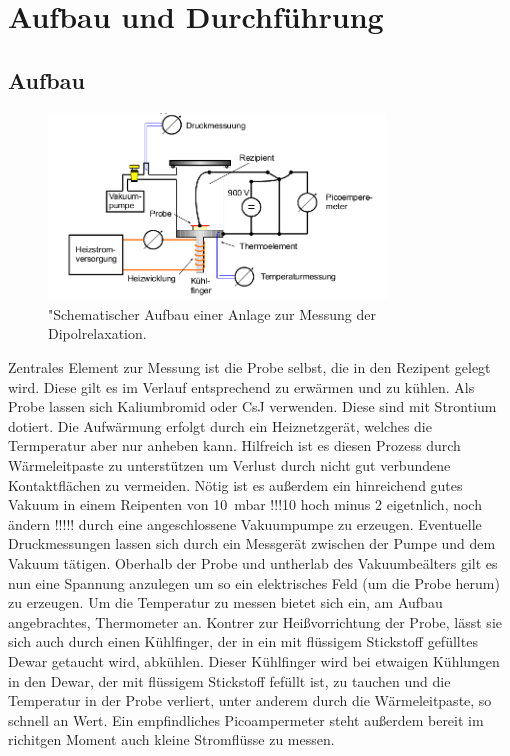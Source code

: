 \section{Aufbau und Durchführung}
\subsection{Aufbau}
\begin{figure}
    \centering
    \includegraphics[width=0.8\textwidth]{bilder/Aufbau.png}
    \caption{"Schematischer Aufbau einer Anlage zur Messung der Dipolrelaxation.
            \cite{skript}}
    \label{fig:aufbau}
\end{figure}

Zentrales Element zur Messung ist die Probe selbst, die in den Rezipent gelegt wird. Diese gilt es im Verlauf entsprechend
zu erwärmen und zu kühlen. Als Probe lassen sich Kaliumbromid oder CsJ verwenden. Diese sind mit Strontium
dotiert. Die Aufwärmung erfolgt durch ein Heiznetzgerät, welches die Termperatur aber nur anheben kann.
Hilfreich ist es diesen Prozess durch Wärmeleitpaste zu unterstützen um
Verlust durch nicht gut verbundene Kontaktflächen zu vermeiden.
Nötig ist es außerdem ein hinreichend gutes Vakuum in einem Reipenten von \SI{10}{\milli\bar} !!!10 hoch minus 2 eigetnlich, noch ändern !!!!! 
durch eine angeschlossene Vakuumpumpe zu erzeugen.
Eventuelle Druckmessungen  lassen sich durch ein Messgerät zwischen der Pumpe und dem Vakuum tätigen.
Oberhalb der Probe und untherlab des Vakuumbeälters gilt es nun eine Spannung anzulegen um so ein 
elektrisches Feld (um die Probe herum) zu erzeugen. Um die Temperatur zu messen bietet sich ein, am Aufbau angebrachtes, Thermometer an.
Kontrer zur Heißvorrichtung der Probe, lässt sie sich auch durch einen Kühlfinger, der in ein mit flüssigem Stickstoff gefülltes Dewar getaucht wird, 
abkühlen.
Dieser Kühlfinger wird bei etwaigen Kühlungen in den Dewar, 
der mit flüssigem Stickstoff fefüllt ist, 
zu tauchen und die Temperatur in der Probe verliert, unter anderem durch die Wärmeleitpaste, so schnell an Wert.
Ein empfindliches Picoampermeter steht außerdem bereit im richitgen Moment auch kleine
Stromflüsse zu messen.

